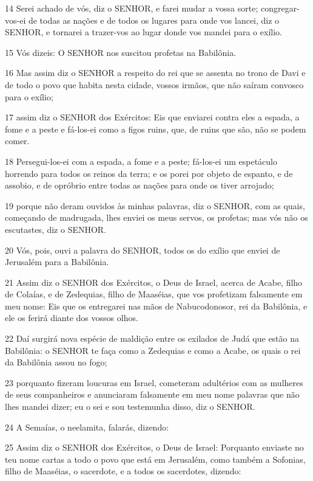 \par 14 Serei achado de vós, diz o SENHOR, e farei mudar a vossa sorte; congregar-vos-ei de todas as nações e de todos os lugares para onde vos lancei, diz o SENHOR, e tornarei a trazer-vos ao lugar donde vos mandei para o exílio.
\par 15 Vós dizeis: O SENHOR nos suscitou profetas na Babilônia.
\par 16 Mas assim diz o SENHOR a respeito do rei que se assenta no trono de Davi e de todo o povo que habita nesta cidade, vossos irmãos, que não saíram convosco para o exílio;
\par 17 assim diz o SENHOR dos Exércitos: Eis que enviarei contra eles a espada, a fome e a peste e fá-los-ei como a figos ruins, que, de ruins que são, não se podem comer.
\par 18 Persegui-los-ei com a espada, a fome e a peste; fá-los-ei um espetáculo horrendo para todos os reinos da terra; e os porei por objeto de espanto, e de assobio, e de opróbrio entre todas as nações para onde os tiver arrojado;
\par 19 porque não deram ouvidos às minhas palavras, diz o SENHOR, com as quais, começando de madrugada, lhes enviei os meus servos, os profetas; mas vós não os escutastes, diz o SENHOR.
\par 20 Vós, pois, ouvi a palavra do SENHOR, todos os do exílio que enviei de Jerusalém para a Babilônia.
\par 21 Assim diz o SENHOR dos Exércitos, o Deus de Israel, acerca de Acabe, filho de Colaías, e de Zedequias, filho de Maaséias, que vos profetizam falsamente em meu nome: Eis que os entregarei nas mãos de Nabucodonosor, rei da Babilônia, e ele os ferirá diante dos vossos olhos.
\par 22 Daí surgirá nova espécie de maldição entre os exilados de Judá que estão na Babilônia: o SENHOR te faça como a Zedequias e como a Acabe, os quais o rei da Babilônia assou no fogo;
\par 23 porquanto fizeram loucuras em Israel, cometeram adultérios com as mulheres de seus companheiros e anunciaram falsamente em meu nome palavras que não lhes mandei dizer; eu o sei e sou testemunha disso, diz o SENHOR.
\par 24 A Semaías, o neelamita, falarás, dizendo:
\par 25 Assim diz o SENHOR dos Exércitos, o Deus de Israel: Porquanto enviaste no teu nome cartas a todo o povo que está em Jerusalém, como também a Sofonias, filho de Maaséias, o sacerdote, e a todos os sacerdotes, dizendo:
